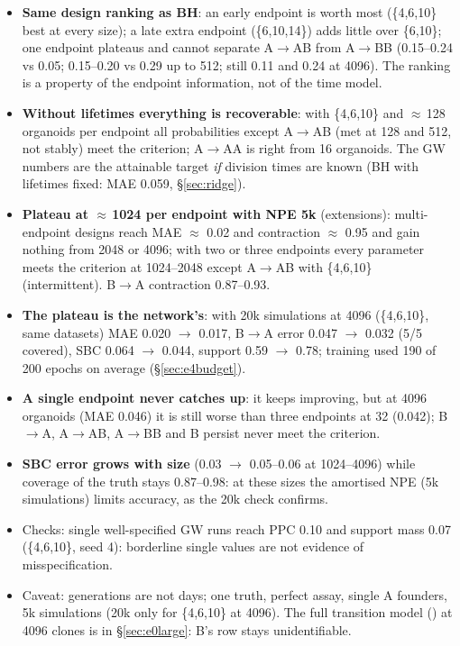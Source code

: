 \documentclass[10pt,a4paper]{article}
\newcommand{\code}[1]{\texttt{\detokenize{#1}}}
\begin{document}
\begin{itemize}
\item \textbf{Same design ranking as BH}: an early endpoint is worth most (\{4,6,10\} best at every size); a late extra endpoint (\{6,10,14\}) adds little over \{6,10\}; one endpoint plateaus and cannot separate A$\to$AB from A$\to$BB (0.15--0.24 vs 0.05; 0.15--0.20 vs 0.29 up to 512; still 0.11 and 0.24 at 4096). The ranking is a property of the endpoint information, not of the time model.
\item \textbf{Without lifetimes everything is recoverable}: with \{4,6,10\} and $\approx$\,128 organoids per endpoint all probabilities except A$\to$AB (met at 128 and 512, not stably) meet the criterion; A$\to$AA is right from 16 organoids. The GW numbers are the attainable target \emph{if} division times are known (BH with lifetimes fixed: MAE 0.059, \S\ref{sec:ridge}).
\item \textbf{Plateau at $\approx$\,1024 per endpoint with NPE 5k} (extensions): multi-endpoint designs reach MAE $\approx$ 0.02 and contraction $\approx$ 0.95 and gain nothing from 2048 or 4096; with two or three endpoints every parameter meets the criterion at 1024--2048 except A$\to$AB with \{4,6,10\} (intermittent). B$\to$A contraction 0.87--0.93.
\item \textbf{The plateau is the network's}: with 20k simulations at 4096 (\{4,6,10\}, same datasets) MAE 0.020 $\to$ 0.017, B$\to$A error 0.047 $\to$ 0.032 (5/5 covered), SBC 0.064 $\to$ 0.044, support 0.59 $\to$ 0.78; training used 190 of 200 epochs on average (\S\ref{sec:e4budget}).
\item \textbf{A single endpoint never catches up}: it keeps improving, but at 4096 organoids (MAE 0.046) it is still worse than three endpoints at 32 (0.042); B$\to$A, A$\to$AB, A$\to$BB and B persist never meet the criterion.
\item \textbf{SBC error grows with size} (0.03 $\to$ 0.05--0.06 at 1024--4096) while coverage of the truth stays 0.87--0.98: at these sizes the amortised NPE (5k simulations) limits accuracy, as the 20k check confirms.
\item Checks: single well-specified GW runs reach PPC 0.10 and support mass 0.07 (\{4,6,10\}, seed 4): borderline single values are not evidence of misspecification.
\item Caveat: generations are not days; one truth, perfect assay, single A founders, 5k simulations (20k only for \{4,6,10\} at 4096). The full transition model (\code{law=two_type}) at 4096 clones is in \S\ref{sec:e0large}: B's row stays unidentifiable.
\end{itemize}
\end{document}
